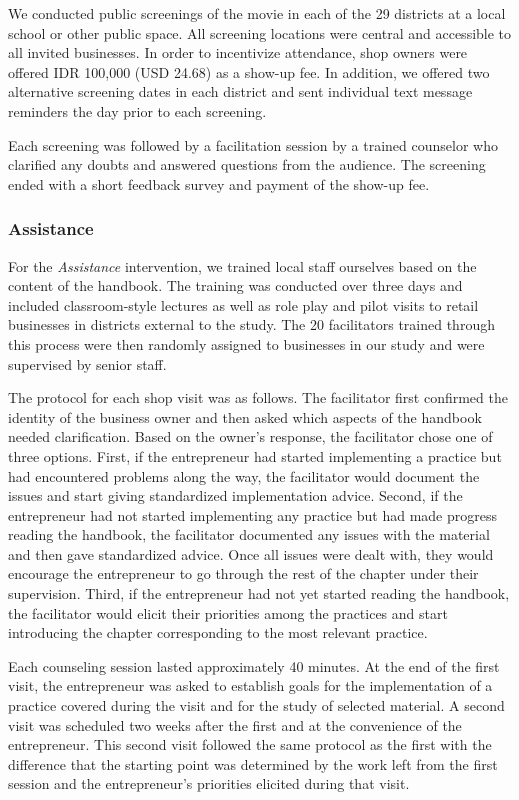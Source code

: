 \documentclass[11.5pt]{article}
\begin{document}
We conducted public screenings of the movie in each of the 29 districts at a local school or other public space. All screening locations were central and accessible to all invited businesses. In order to incentivize attendance, shop owners were offered IDR 100,000 (USD 24.68) as a show-up fee. In addition, we offered two alternative screening dates in each district and sent individual text message reminders the day prior to each screening.

Each screening was followed by a facilitation session by a trained counselor who clarified any doubts and answered questions from the audience. The screening ended with a short feedback survey and payment of the show-up fee. \\

\subsubsection{Assistance}

For the \emph{Assistance} intervention, we trained local staff ourselves based on the content of the handbook. The training was conducted over three days and included classroom-style lectures as well as role play and pilot visits to retail businesses in districts external to the study. The 20 facilitators trained through this process were then randomly assigned to businesses in our study and were supervised by senior staff.

The protocol for each shop visit was as follows. The facilitator first confirmed the identity of the business owner and then asked which aspects of the handbook needed clarification. Based on the owner's response, the facilitator chose one of three options. First, if the entrepreneur had started implementing a practice but had encountered problems along the way, the facilitator would document the issues and start giving standardized implementation advice. Second, if the entrepreneur had not started implementing any practice but had made progress reading the handbook, the facilitator documented any issues with the material and then gave standardized advice. Once all issues were dealt with, they would encourage the entrepreneur to go through the rest of the chapter under their supervision. Third, if the entrepreneur had not yet started reading the handbook, the facilitator would elicit their priorities among the practices and start introducing the chapter corresponding to the most relevant practice. 

Each counseling session lasted approximately 40 minutes. At the end of the first visit, the entrepreneur was asked to establish goals for the implementation of a practice covered during the visit and for the study of selected material. A second visit was scheduled two weeks after the first and at the convenience of the entrepreneur. This second visit followed the same protocol as the first with the difference that the starting point was determined by the work left from the first session and the entrepreneur's priorities elicited during that visit.   \\
\end{document}
